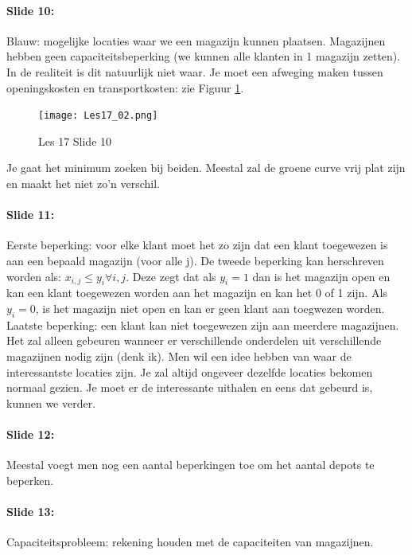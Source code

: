 \documentclass[10pt,a4paper]{report}
\begin{document}
\paragraph{Slide 10:} Blauw: mogelijke locaties waar we een magazijn kunnen plaatsen. Magazijnen hebben geen capaciteitsbeperking (we kunnen alle klanten in 1 magazijn zetten). In de realiteit is dit natuurlijk niet waar. Je moet een afweging maken tussen openingskosten en transportkosten: zie Figuur \ref{les17_02}.\\

\begin{figure}[h!]
\centering
\texttt{[image: Les17\_02.png]}
\caption{Les 17 Slide 10} 
\label{les17_02}
\end{figure}

Je gaat het minimum zoeken bij beiden. Meestal zal de groene curve vrij plat zijn en maakt het niet zo'n verschil.

\paragraph{Slide 11:} Eerste beperking: voor elke klant moet het zo zijn dat een klant toegewezen is aan een bepaald magazijn (voor alle j). De tweede beperking kan herschreven worden als: $ x_{i,j} \leq y_{i}  \forall i,j$. Deze zegt dat als $y_{i} = 1$ dan is het magazijn open en kan een klant toegewezen worden aan het magazijn en kan het 0 of 1 zijn. Als $y_{i} = 0$, is het magazijn niet open en kan er geen klant aan toegwezen worden.\\
Laatste beperking: een klant kan niet toegewezen zijn aan meerdere magazijnen. Het zal alleen gebeuren wanneer er verschillende onderdelen uit verschillende magazijnen nodig zijn (denk ik). %
Men wil een idee hebben van waar de interessantste locaties zijn. Je zal altijd ongeveer dezelfde locaties bekomen normaal gezien. Je moet er de interessante uithalen en eens dat gebeurd is, kunnen we verder.

\paragraph{Slide 12:} Meestal voegt men nog een aantal beperkingen toe om het aantal depots te beperken. 

\paragraph{Slide 13:} Capaciteitsprobleem: rekening houden met de capaciteiten van magazijnen.
\end{document}

